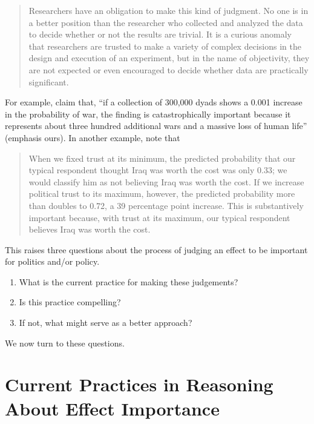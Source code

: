\documentclass[12pt]{article}
\begin{document}
\begin{quote}
Researchers have an obligation to make this kind of judgment. No one is in a better position than the researcher who collected and analyzed the data to decide whether or not the results are trivial. It is a curious anomaly that researchers are trusted to make a variety of complex decisions in the design and execution of an experiment, but in the name of objectivity, they are not expected or even encouraged to decide whether data are practically significant.
\end{quote}

For example, \citet[p. 711]{KingZeng2001} claim that, ``if a collection of 300,000 dyads shows a 0.001 increase in the probability of war, the finding is catastrophically important because it represents about three hundred additional wars and a massive loss of human life'' (emphasis ours). In another example, \citet[p. 317]{HetheringtonSuhay2011} note that 
\begin{quote}
When we fixed trust at its minimum, the predicted probability that our typical respondent thought Iraq was worth the cost was only 0.33; we would classify him as not believing Iraq was worth the cost. If we increase political trust to its maximum, however, the predicted probability more than doubles to 0.72, a 39 percentage point increase. This is substantively important because, with trust at its maximum, our typical respondent believes Iraq was worth the cost.
\end{quote}
This raises three questions about the process of judging an effect to be important for politics and/or policy.
\begin{enumerate}
\item What is the current practice for making these judgements?
\item Is this practice compelling?
\item If not, what might serve as a better approach?
\end{enumerate}
\noindent We now turn to these questions.

\section*{Current Practices in Reasoning About Effect Importance}

\end{document}

